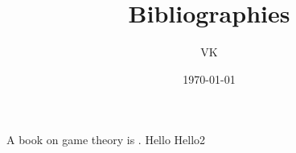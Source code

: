\documentclass{article}
\title{Bibliographies}
\author{VK}
\date{\today}
\begin{document}
\maketitle

A book on game theory is \cite{keil}.
Hello \cite{Monika}
Hello2\cite{Mager}

\newpage


\end{document}
